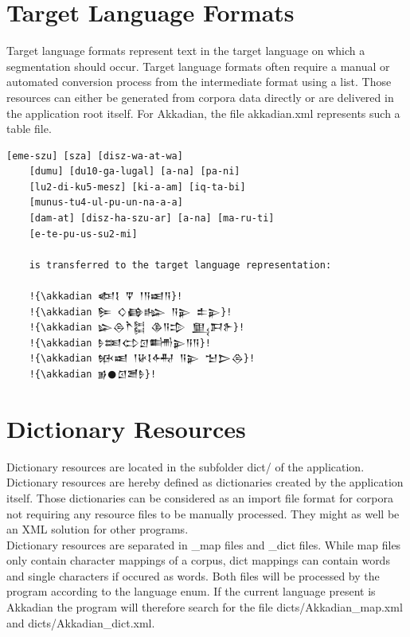 \documentclass[10pt,a4paper,titlepage]{report}
\begin{document}
	\section{Target Language Formats}
	Target language formats represent text in the target language on which a segmentation should occur. Target language formats often require a manual or automated conversion process from the intermediate format using a list. Those resources can either be generated from corpora data directly or are delivered in the application root itself. For Akkadian, the file akkadian.xml represents such a table file.
	\begin{lstlisting}[caption=Target Language Representation,escapechar=!]
	[eme-szu] [sza] [disz-wa-at-wa] 
	[dumu] [du10-ga-lugal] [a-na] [pa-ni] 
	[lu2-di-ku5-mesz] [ki-a-am] [iq-ta-bi] 
	[munus-tu4-ul-pu-un-na-a-a] 
	[dam-at] [disz-ha-szu-ar] [a-na] [ma-ru-ti] 
	[e-te-pu-us-su2-mi]
	
	is transferred to the target language representation:
	
	!{\akkadian 𒅴𒋙 𒐼 𒁹𒀀𒀜𒀀}!
	!{\akkadian 𒌉 𒄭𒂵𒈗 𒀀𒉌 𒉺𒉌}!
	!{\akkadian 𒇽𒁲𒋻𒌊 𒆠𒀀𒄠 𒅅𒁕𒉿}!
	!{\akkadian 𒊩𒌅𒌌𒇥𒌦𒉌𒀀𒀀}!
	!{\akkadian 𒁮𒀜 𒁹𒄩𒋙𒅈 𒀀𒉌 𒈠𒆕𒁲}!
	!{\akkadian 𒂊𒊹𒇥𒍪𒊩}! 
	\end{lstlisting}
	\section{Dictionary Resources}
	Dictionary resources are located in the subfolder dict/ of the application. Dictionary resources are hereby defined as dictionaries created by the application itself. Those dictionaries can be considered as an import file format for corpora not requiring any resource files to be manually processed. They might as well be an XML solution for other programs.\\
	Dictionary resources are separated in \_map files and \_dict files. While map files only contain character mappings of a corpus, dict mappings can contain words and single characters if occured as words. Both files will be processed by the program according to the language enum. If the current language present is Akkadian the program will therefore search for the file dicts/Akkadian\_map.xml and dicts/Akkadian\_dict.xml.
\end{document}
